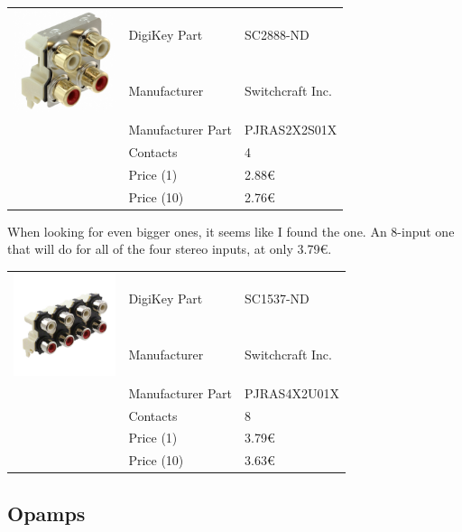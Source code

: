 \documentclass[a4paper]{article}
\begin{document}
\begin{center}
\begin{tabular}{@{}p{3cm}p{3cm}p{3cm}@{}}
\multirow{2}{3cm}{\includegraphics[width=3cm]{images/PJRAS2X2S01AUX}}
& DigiKey Part & SC2888-ND\\
& Manufacturer & Switchcraft Inc.\\
& Manufacturer Part & PJRAS2X2S01X\\
& Contacts & 4\\
& Price (1) & 2.88€\\
& Price (10) & 2.76€\\
\end{tabular}
\end{center}

When looking for even bigger ones, it seems like I found the one. An 8-input one that will do for all of the four stereo inputs, at only 3.79€.

\begin{center}
\begin{tabular}{@{}p{3cm}p{3cm}p{3cm}@{}}
\multirow{2}{3cm}{\includegraphics[width=3cm]{images/PJRAS4X2U01X}}
& DigiKey Part & SC1537-ND\\
& Manufacturer & Switchcraft Inc.\\
& Manufacturer Part & PJRAS4X2U01X\\
& Contacts & 8\\
& Price (1) & 3.79€\\
& Price (10) & 3.63€\\
\end{tabular}
\end{center}

\subsection{Opamps}
\end{document}
